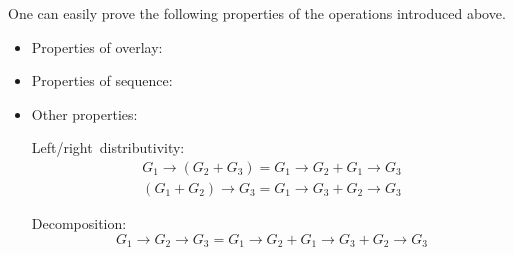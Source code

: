 One can easily prove the following properties of the operations introduced
above.
\begin{itemize}
\item \hspace{-1mm}Properties of overlay:

\item \hspace{-1mm}Properties of sequence:

\item \hspace{-1mm}Other properties:


\hspace{2mm}Left/right~distributivity: \vspace{-0.3em}
\[
\begin{array}{c}
G_{1}\rightarrow(G_{2}+G_{3})=G_{1}\rightarrow G_{2}+G_{1}\rightarrow G_{3}\\
(G_{1}+G_{2})\rightarrow G_{3}=G_{1}\rightarrow G_{3}+G_{2}\rightarrow G_{3}
\end{array}
\]
\vspace{-1em}



\hspace{2mm}Decomposition: \vspace{-0.3em}
\[
G_{1}\!\rightarrow\! G_{2}\!\rightarrow\! G_{3}\!=\! G_{1}\!\rightarrow\! G_{2}+G_{1}\!\rightarrow\! G_{3}+G_{2}\!\rightarrow\! G_{3}
\]
\vspace{-1.3em}



\end{itemize}
